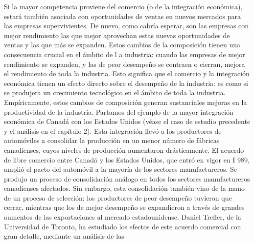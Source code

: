 \documentclass[10pt,a4paper]{article}
\begin{document}
Si la mayor competencia proviene del comercio (o de la integración económica), estará también asociada con oportunidades de ventas en nuevos mercados para las empresas supervivientes. De nuevo, como cabría esperar, son las empresas con mejor rendimiento las que mejor aprovechan estas nuevas oportunidades de ventas y las que más se expanden. Estos cambios de la composición tienen una consecuencia crucial en el ámbito de l a industria: cuando las empresas de mejor rendimiento se expanden, y las de peor desempeño se contraen o cierran, mejora el rendimiento de toda la industria. Esto significa que el comercio y la integración económica tienen un efecto directo sobre el desempeño de la industria: es como si se produjera un crecimiento tecnológico en el ámbito de toda la industria. Empíricamente, estos cambios de composición generan sustanciales mejoras en la productividad de la industria. Partamos del ejemplo de la mayor integración económica de Canadá con los Estados Unidos (véase el caso de estudio precedente y el análisis en el capítulo 2). Esta integración llevó a los productores de automóviles a consolidar la producción en un menor número de fábricas canadienses, cuyos niveles de producción aumentaron drásticamente. El acuerdo de libre comercio entre Canadá y los Estados Unidos, que entró en vigor en I 989, amplió el pacto del automóvil a la mayoría de los sectores manufactureros. Se produjo un proceso de consolidación análogo en todos los sectores manufactureros canadienses afectados. Sin embargo, esta consolidación también vino de la mano de un proceso de selección: los productores de peor desempeño tuvieron que cerrar, mientras que los de mejor desempeño se expandieron a través de grandes aumentos de las exportaciones al mercado estadounidense. Daniel Trefler, de la Universidad de Toronto, ha estudiado los efectos de este acuerdo comercial con gran detalle, mediante un análisis de las
\end{document}
